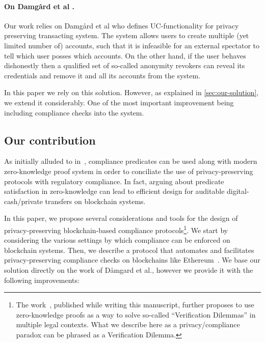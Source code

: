 \documentclass[runningheads,10pt]{llncs}
\numberwithin{equation}{section}
\begin{document}
\paragraph{On Damgård et al \cite{EPRINT:DGKOS20}.}
Our work relies on Damgård et al \cite{EPRINT:DGKOS20} who defines
UC-functionality for privacy preserving transacting system. The system allows
users to create multiple (yet limited number of) accounts, such that it is
infeasible for an external spectator to tell which user posses which
accounts. On the other hand, if the user behaves dishonestly then a qualified
set of so-called anonymity revokers can reveal its credentials and remove it and
all its accounts from the system.

In this paper we rely on this solution. However, as explained in
\cref{sec:our-solution}, we extend it considerably. One of the most important
improvement being including compliance checks into the system.

\subsection{Our contribution}
\label{sec:our-contribution}

As initially alluded to in~\cite{DBLP:journals/corr/abs-2008-05958}, compliance
predicates can be used along with modern zero-knowledge proof system in order
to conciliate the use of privacy-preserving protocols with regulatory
compliance. In fact, arguing about predicate satisfaction in zero-knowledge can
lead to efficient design for auditable digital-cash/private transfers on
blockchain systems.

In this paper, we propose several considerations and tools for the design of
privacy-preserving blockchain-based compliance protocols\footnote{The
work~\cite{zkp-and-law}, published while writing this manuscript, further
proposes to use zero-knowledge proofs as a way to solve so-called
``Verification Dilemmas'' in multiple legal contexts. What we describe here as
a privacy/compliance paradox can be phrased as a Verification Dilemma.}. We
start by considering the various settings by which compliance can be enforced
on blockchain systems. Then, we describe a protocol that automates and
facilitates privacy-preserving compliance checks on blockchains like
Ethereum~\cite{ethyellowpaper}. We base our solution directly on the work of
Dåmgard et al.\cite{EPRINT:DGKOS20}, however we provide it with the following
improvements:
\end{document}
